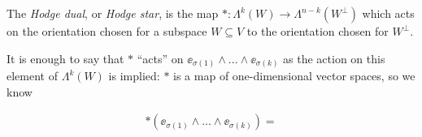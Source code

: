 \begin{itemize}
\begin{itemize}
            The \textit{Hodge dual}, or \textit{Hodge star}, is the map $*:\Lambda^k(W) \rightarrow \Lambda^{n - k}(W^\perp)$ which acts on the orientation chosen for a subspace $W \subseteq V$ to the orientation chosen for $W^\perp$.
            
            It is enough to say that $*$ ``acts'' on $\ee_{\sigma(1)} \wedge ... \wedge \ee_{\sigma(k)}$ as the action on this element of $\Lambda^k(W)$ is implied: $*$ is a map of one-dimensional vector spaces, so we know
            
            \begin{align*}
                *(\ee_{\sigma(1)} \wedge ... \wedge \ee_{\sigma(k)}) = 
            \end{align*}
        \end{itemize}
\end{itemize}
